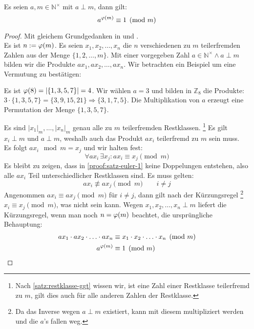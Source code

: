 \begin{satz}
  Es seien $a,m \in \mathbb{N}^\times$ mit $a \perp m$, dann gilt:
  \begin{equation*}
    a^{\varphi(m)} \equiv 1 \pmod{m}
  \end{equation*}
\end{satz}
\begin{proof}
  Mit gleichem Grundgedanken in \parencite{SITE:phi-euler-fermat} und
  \parencite[187-188]{BOOK:numberTheory}. \\
  Es ist $n := \varphi(m)$. Es seien $x_1,x_2,\ldots,x_n$ die $n$ verschiedenen zu
  $m$ teilerfremden Zahlen aus der Menge $\{1,2,\ldots,m\}$.
  Mit einer vorgegeben Zahl
  $a \in \mathbb{N}^\times \wedge a \perp m$ bilden wir die Produkte $ax_1,ax_2,\ldots,ax_n$.
  Wir betrachten ein Beispiel um eine Vermutung zu bestätigen:
  \begin{example}
    Es ist $\varphi(8) = |\{1,3,5,7\}| = 4$. Wir wählen $a = 3$ und bilden in $\mathbb{Z}_8$ die Produkte:
    $3\cdot \{1,3,5,7\} = \{3,9,15,21\} \Rightarrow \{3,1,7,5\}$. Die Multiplikation von $a$ erzeugt eine
    Permutation der Menge $\{1,3,5,7\}$.
  \end{example}
  \noindent
  Es sind $|x_1|_m,\ldots,|x_n|_m$ genau alle zu $m$ teilerfremden Restklassen.
  \footnote{
    Nach \autoref{satz:restklasse-ggt} wissen wir, ist eine Zahl einer Restklasse teilerfremd zu $m$,
    gilt dies auch für alle anderen Zahlen der Restklasse.
  }
  Es gilt $x_i \perp m$ und $a \perp m$, weshalb auch das Produkt $ax_i$ teilerfremd zu $m$ sein muss.\\
  Es folgt $ax_i \mod{m} = x_j$ und wir halten fest:
  \begin{equation}
    \label{proof:satz-euler-1}
    \forall ax_i \, \exists x_j: ax_i \equiv x_j \pmod{m}
  \end{equation}
  Es bleibt zu zeigen, dass in \eqref{proof:satz-euler-1} keine Doppelungen entstehen,
  also alle $ax_i$ Teil unterschiedlicher Restklassen sind. Es muss gelten:
  \begin{equation*}
    ax_i \not\equiv ax_j \pmod{m} \qquad i \neq j
  \end{equation*}
  Angenommen $ax_i \equiv ax_j \pmod{m}$ für $i \neq j$, dann gilt nach der Kürzungsregel
  \footnote{
    Da das Inverse wegen $a \perp m$ existiert, kann mit diesem multipliziert werden und die $a$'s
    fallen weg.
  }
  $x_i \equiv x_j \pmod{m}$, was nicht sein kann.
  Wegen $x_1,x_2,\ldots,x_n \perp m$ liefert die Kürzungsregel, wenn man noch
  $n = \varphi(m)$ beachtet, die ursprüngliche Behauptung:
  \begin{align*}
    ax_1 \cdot ax_2 \cdot \ldots \cdot ax_n & \equiv
    x_1 \cdot x_2 \cdot \ldots \cdot x_n  \pmod{m}                       \\
    a^{\varphi(m)}                            & \equiv 1 \pmod{m} \qedhere
  \end{align*}
\end{proof}

